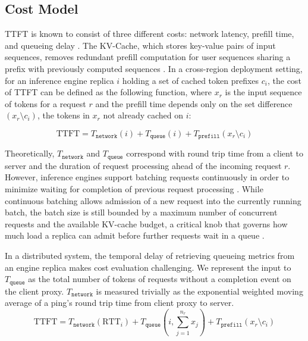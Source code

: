 \documentclass{article}
\begin{document}
\subsection{Cost Model}

TTFT is known to consist of three different costs: network latency, prefill time, and queueing delay \citep{banaserve2025}. The KV-Cache, which stores key-value pairs of input sequences, removes redundant prefill computation for user sequences sharing a prefix with previously computed sequences \citep{sglang2024}. In a cross-region deployment setting, for an inference engine replica $i$ holding a set of cached token prefixes $c_i$, the cost of TTFT can be defined as the following function, where $x_r$ is the input sequence of tokens for a request $r$ and the prefill time depends only on the set difference $(x_r \setminus c_i)$, the tokens in $x_r$ not already cached on $i$:

\begin{equation}
\mathrm{TTFT} = T_{\texttt{network}}(i) + T_{\texttt{queue}}(i) + T_{\texttt{prefill}}(x_r \setminus c_i)
\label{eq:ttft}
\end{equation}

Theoretically, $T_{\texttt{network}}$ and $T_{\texttt{queue}}$ correspond with round trip time from a client to server and the duration of request processing ahead of the incoming request $r$. However, inference engines support batching requests continuously in order to minimize waiting for completion of previous request processing \citep{orca2022}. While continuous batching allows admission of a new request into the currently running batch, the batch size is still bounded by a maximum number of concurrent requests and the available KV-cache budget, a critical knob that governs how much load a replica can admit before further requests wait in a queue \citep{vllm2023}.

In a distributed system, the temporal delay of retrieving queueing metrics from an engine replica makes cost evaluation challenging. We represent the input to $T_{\texttt{queue}}$ as the total number of tokens of requests without a completion event on the client proxy. $T_{\texttt{network}}$ is measured trivially as the exponential weighted moving average of a ping's round trip time from client proxy to server.
\begin{equation}
\mathrm{TTFT} = T_{\texttt{network}}(\mathrm{RTT}_i) + T_{\texttt{queue}}\left(i, \sum_{j=1}^{n_r} x_j\right) + T_{\texttt{prefill}}(x_r \setminus c_i)
\label{eq:ttft-proxy}
\end{equation}
\end{document}
